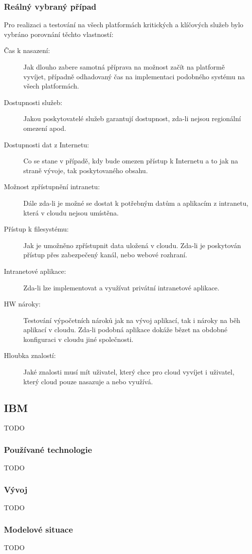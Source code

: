\subsubsection{Reálný vybraný případ}
Pro realizaci a testování na všech platformách kritických a klíčových služeb bylo vybráno porovnání těchto vlastností:
\begin{description}
	\item [Čas k nasazení:] Jak dlouho zabere samotná příprava na možnost začít na platformě vyvíjet, případně odhadovaný čas na implementaci podobného systému na všech platformách.
	\item [Dostupnosti služeb:] Jakou poskytovatelé služeb garantují dostupnost, zda-li nejsou regionální omezení apod.
	\item [Dostupnosti dat z Internetu:] Co se stane v případě, kdy bude omezen přístup k Internetu a to jak na straně vývoje, tak poskytovaného obsahu.
	\item [Možnost zpřístupnění intranetu:] Dále zda-li je možné se dostat k potřebným datům a aplikacím z intranetu, která v cloudu nejsou umístěna.
	\item [Přístup k filesystému:] Jak je umožněno zpřístupnit data uložená v cloudu. Zda-li je poskytován přístup přes zabezpečený kanál, nebo webové rozhraní.
	\item [Intranetové aplikace:] Zda-li lze implementovat a využívat privátní intranetové aplikace.
	\item [HW nároky:] Testování výpočetních nároků jak na vývoj aplikací, tak i nároky na běh aplikací v cloudu. Zda-li podobná aplikace dokáže bězet na obdobné konfiguraci v cloudu jiné společnosti.
	\item [Hloubka znalostí:] Jaké znalosti musí mít uživatel, který chce pro cloud vyvíjet i uživatel, který cloud pouze nasazuje a nebo využívá.
\end{description}

\subsection{IBM}
TODO
\subsubsection{Používané technologie}
TODO
\subsubsection{Vývoj}
TODO
\subsubsection{Modelové situace}
TODO
